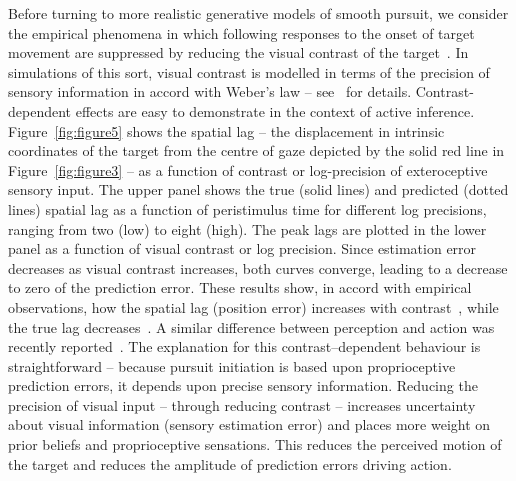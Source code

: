 \documentclass[a4paper]{article} %
\begin{document}
Before turning to more realistic generative models of smooth pursuit, we
consider the empirical phenomena in which following responses to the
onset of target movement are suppressed by reducing the visual contrast
of the target~\citep{Thompson82}. In simulations of this sort, visual
contrast is modelled in terms of the precision of sensory information in
accord with Weber's law -- see~\citep{Feldman10a} for details.
Contrast-dependent effects are easy to demonstrate in the context of
active inference. Figure~\ref{fig:figure5} shows the spatial lag -- the displacement in
intrinsic coordinates of the target from the centre of gaze depicted by
the solid red line in Figure~\ref{fig:figure3} -- as a function of contrast or
log-precision of exteroceptive sensory input. The upper panel shows the
true (solid lines) and predicted (dotted lines) spatial lag as a
function of peristimulus time for different log precisions, ranging from
two (low) to eight (high). The peak lags are plotted in the lower panel
as a function of visual contrast or log precision. Since estimation
error decreases as visual contrast increases, both curves converge,
leading to a decrease to zero of the prediction error. These results
show, in accord with empirical observations, how the spatial lag
(position error) increases with contrast~\citep{Arnold09}, while the
true lag decreases~\citep{Spering05}. A similar difference between perception and action was recently reported~\citep{Simoncini12}. The explanation for this
contrast--dependent behaviour is straightforward -- because pursuit
initiation is based upon proprioceptive prediction errors, it depends
upon precise sensory information. Reducing the precision of visual input
-- through reducing contrast -- increases uncertainty about visual
information (sensory estimation error) and places more weight on prior
beliefs and proprioceptive sensations. This reduces the perceived motion
of the target and reduces the amplitude of prediction errors driving
action.
\end{document}
